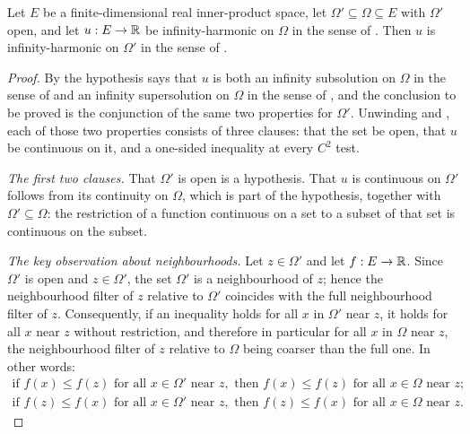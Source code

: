 \begin{lemma}
Let $E$ be a finite-dimensional real inner-product space, let
$\Omega'\subseteq\Omega\subseteq E$ with $\Omega'$ open, and let $u:E\to\mathbb{R}$ be
infinity-harmonic on $\Omega$ in the sense of . Then
$u$ is infinity-harmonic on $\Omega'$ in the sense of .
\end{lemma}
\begin{proof}
By  the hypothesis says that $u$ is both an infinity
subsolution on $\Omega$ in the sense of  and an
infinity supersolution on $\Omega$ in the sense of
, and the conclusion to be proved is the
conjunction of the same two properties for $\Omega'$. Unwinding
 and , each of those
two properties consists of three clauses: that the set be open, that $u$ be
continuous on it, and a one-sided inequality at every $C^2$ test.

\emph{The first two clauses.} That $\Omega'$ is open is a hypothesis. That $u$
is continuous on $\Omega'$ follows from its continuity on $\Omega$, which is part
of the hypothesis, together with $\Omega'\subseteq\Omega$: the restriction of a
function continuous on a set to a subset of that set is continuous on the
subset.

\emph{The key observation about neighbourhoods.} Let $z\in\Omega'$ and let
$f:E\to\mathbb{R}$. Since $\Omega'$ is open and $z\in\Omega'$, the set $\Omega'$ is a
neighbourhood of $z$; hence the neighbourhood filter of $z$ relative to
$\Omega'$ coincides with the full neighbourhood filter of $z$. Consequently, if
an inequality holds for all $x$ in $\Omega'$ near $z$, it holds for all $x$ near
$z$ without restriction, and therefore in particular for all $x$ in $\Omega$
near $z$, the neighbourhood filter of $z$ relative to $\Omega$ being coarser
than the full one. In other words:
\begin{equation}\label{eq:ihm-key}
  \begin{gathered}
  \text{if } f(x)\le f(z) \text{ for all } x\in\Omega' \text{ near } z,
  \text{ then } f(x)\le f(z) \text{ for all } x\in\Omega \text{ near } z;\\
  \text{if } f(z)\le f(x) \text{ for all } x\in\Omega' \text{ near } z,
  \text{ then } f(z)\le f(x) \text{ for all } x\in\Omega \text{ near } z.
  \end{gathered}
\end{equation}


\end{proof}
